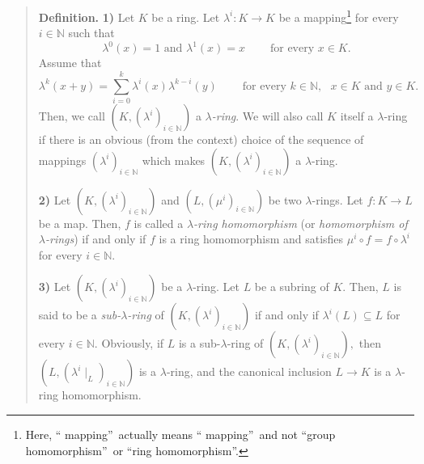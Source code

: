 \documentclass[numbers=enddot,12pt,final,onecolumn,notitlepage]{scrartcl}%
\begin{document}
\begin{quote}
\textbf{Definition.} \textbf{1)} Let $K$ be a ring. Let $\lambda
^{i}:K\rightarrow K$ be a mapping\footnote{Here, \textquotedblleft
mapping\textquotedblright\ actually means \textquotedblleft
mapping\textquotedblright\ and not \textquotedblleft group
homomorphism\textquotedblright\ or \textquotedblleft ring
homomorphism\textquotedblright.} for every $i\in\mathbb{N}$ such that%
\begin{equation}
\lambda^{0}\left(  x\right)  =1\text{ and }\lambda^{1}\left(  x\right)
=x\ \ \ \ \ \ \ \ \ \ \text{for every }x\in K. \label{lambda0}%
\end{equation}
Assume that%
\begin{equation}
\lambda^{k}\left(  x+y\right)  =\sum_{i=0}^{k}\lambda^{i}\left(  x\right)
\lambda^{k-i}\left(  y\right)  \ \ \ \ \ \ \ \ \ \ \text{for every }%
k\in\mathbb{N},\text{ }x\in K\text{ and }y\in K. \label{lambda1}%
\end{equation}
Then, we call $\left(  K,\left(  \lambda^{i}\right)  _{i\in\mathbb{N}}\right)
$ a $\lambda$\textit{-ring}. We will also call $K$ itself a $\lambda$-ring if
there is an obvious (from the context) choice of the sequence of mappings
$\left(  \lambda^{i}\right)  _{i\in\mathbb{N}}$ which makes $\left(  K,\left(
\lambda^{i}\right)  _{i\in\mathbb{N}}\right)  $ a $\lambda$-ring.

\textbf{2)} Let $\left(  K,\left(  \lambda^{i}\right)  _{i\in\mathbb{N}%
}\right)  $ and $\left(  L,\left(  \mu^{i}\right)  _{i\in\mathbb{N}}\right)  $
be two $\lambda$-rings. Let $f:K\rightarrow L$ be a map. Then, $f$ is called a
$\lambda$\textit{-ring homomorphism} (or \textit{homomorphism of }$\lambda
$\textit{-rings}) if and only if $f$ is a ring homomorphism and satisfies
$\mu^{i}\circ f=f\circ\lambda^{i}$ for every $i\in\mathbb{N}$.

\textbf{3)} Let $\left(  K,\left(  \lambda^{i}\right)  _{i\in\mathbb{N}%
}\right)  $ be a $\lambda$-ring. Let $L$ be a subring of $K$. Then, $L$ is
said to be a \textit{sub-}$\lambda$\textit{-ring} of $\left(  K,\left(
\lambda^{i}\right)  _{i\in\mathbb{N}}\right)  $ if and only if $\lambda
^{i}\left(  L\right)  \subseteq L$ for every $i\in\mathbb{N}$. Obviously, if
$L$ is a sub-$\lambda$-ring of $\left(  K,\left(  \lambda^{i}\right)
_{i\in\mathbb{N}}\right)  ,$ then $\left(  L,\left(  \lambda^{i}\mid
_{L}\right)  _{i\in\mathbb{N}}\right)  $ is a $\lambda$-ring, and the
canonical inclusion $L\rightarrow K$ is a $\lambda$-ring homomorphism.
\end{quote}
\end{document}
